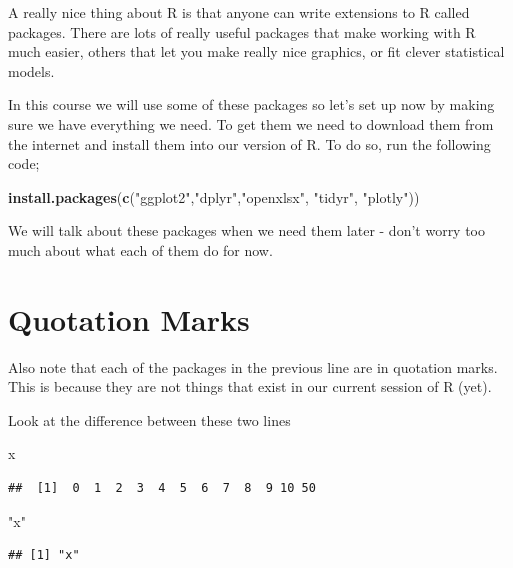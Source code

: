 \documentclass[]{book}
\newenvironment{Shaded}{\begin{snugshade}}{\end{snugshade}}
\newcommand{\KeywordTok}[1]{\textcolor[rgb]{0.13,0.29,0.53}{\textbf{#1}}}
\newcommand{\NormalTok}[1]{#1}
\newcommand{\StringTok}[1]{\textcolor[rgb]{0.31,0.60,0.02}{#1}}
\begin{document}
A really nice thing about R is that anyone can write extensions to R called packages. There are lots of really useful packages that make working with R much easier, others that let you make really nice graphics, or fit clever statistical models.

In this course we will use some of these packages so let's set up now by making sure we have everything we need. To get them we need to download them from the internet and install them into our version of R. To do so, run the following code;

\begin{Shaded}
\begin{Highlighting}[]
\KeywordTok{install.packages}\NormalTok{(}\KeywordTok{c}\NormalTok{(}\StringTok{"ggplot2"}\NormalTok{,}\StringTok{"dplyr"}\NormalTok{,}\StringTok{"openxlsx"}\NormalTok{, }\StringTok{"tidyr"}\NormalTok{, }\StringTok{"plotly"}\NormalTok{))}
\end{Highlighting}
\end{Shaded}

We will talk about these packages when we need them later - don't worry too much about what each of them do for now.

\hypertarget{quotation-marks}{%
\section{Quotation Marks}\label{quotation-marks}}

Also note that each of the packages in the previous line are in quotation marks. This is because they are not things that exist in our current session of R (yet).

Look at the difference between these two lines

\begin{Shaded}
\begin{Highlighting}[]
\NormalTok{x}
\end{Highlighting}
\end{Shaded}

\begin{verbatim}
##  [1]  0  1  2  3  4  5  6  7  8  9 10 50
\end{verbatim}

\begin{Shaded}
\begin{Highlighting}[]
\StringTok{"x"}
\end{Highlighting}
\end{Shaded}

\begin{verbatim}
## [1] "x"
\end{verbatim}
\end{document}
